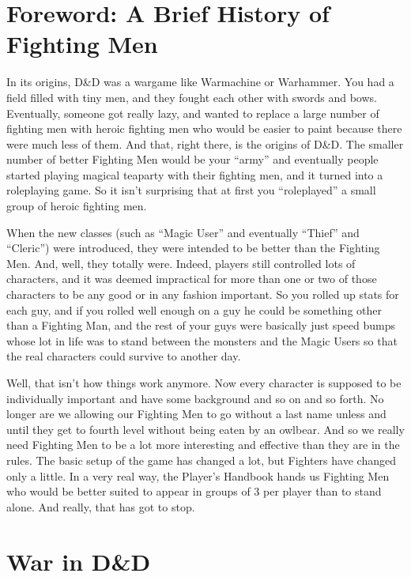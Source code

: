 \chapter*{Foreword: A Brief History of Fighting Men}

In its origins, D\&D was a wargame like Warmachine or Warhammer. You had a field filled with tiny men, and they fought each other with swords and bows. Eventually, someone got really lazy, and wanted to replace a large number of fighting men with heroic fighting men who would be easier to paint because there were much less of them. And that, right there, is the origins of D\&D. The smaller number of better Fighting Men would be your ``army'' and eventually people started playing magical teaparty with their fighting men, and it turned into a roleplaying game. So it isn't surprising that at first you ``roleplayed'' a small group of heroic fighting men.

When the new classes (such as ``Magic User'' and eventually ``Thief'' and ``Cleric'') were introduced, they were intended to be better than the Fighting Men. And, well, they totally were. Indeed, players still controlled lots of characters, and it was deemed impractical for more than one or two of those characters to be any good or in any fashion important. So you rolled up stats for each guy, and if you rolled well enough on a guy he could be something other than a Fighting Man, and the rest of your guys were basically just speed bumps whose lot in life was to stand between the monsters and the Magic Users so that the real characters could survive to another day.

Well, that isn't how things work anymore. Now every character is supposed to be individually important and have some background and so on and so forth. No longer are we allowing our Fighting Men to go without a last name unless and until they get to fourth level without being eaten by an owlbear. And so we really need Fighting Men to be a lot more interesting and effective than they are in the rules. The basic setup of the game has changed a lot, but Fighters have changed only a little. In a very real way, the Player's Handbook hands us Fighting Men who would be better suited to appear in groups of 3 per player than to stand alone. And really, that has got to stop.

\chapter{War in D\&D}
\vspace*{-10pt}

